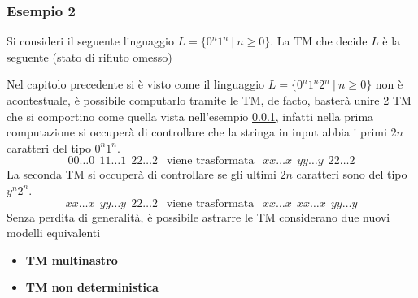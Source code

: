 \documentclass[10pt, letterpaper]{report}
\begin{document}
\subsubsection{Esempio 2}\label{esempioTM2}
Si consideri il seguente linguaggio $L=\{0^n1^n \ | \ n\ge 0\}$. La TM che decide $L$ è la seguente (stato di 
rifiuto omesso)\begin{center}
\end{center}
Nel capitolo precedente si è visto come il linguaggio $L=\{0^n1^n2^n \ | \ n\ge 0\}$  non è acontestuale, 
è possibile computarlo tramite le TM, de facto, basterà unire 2 TM che si comportino come 
quella vista nell'esempio \ref{esempioTM2}, infatti nella prima computazione si occuperà di controllare 
che la stringa in input abbia i primi $2n$ caratteri del tipo $0^n1^n$.$$
00\dots 0 \  \ 11\dots 1 \ \ 22\dots 2  \ \ \text{ viene trasformata } \ \ xx\dots x \ \ yy\dots y \ \ 22\dots 2$$
La seconda TM si occuperà di controllare se gli ultimi $2n$ caratteri sono del tipo $y^n2^n$. $$
xx \dots x \ \ yy\dots y\  \ 22\dots 2 \ \ \text{ viene trasformata }  \  \ xx\dots x \ \  xx \dots x  \ \ yy \dots y
$$
Senza perdita di generalità, è possibile astrarre le TM considerano due nuovi modelli equivalenti\begin{itemize}
    \item \textbf{TM multinastro}
    \item \textbf{TM non deterministica}
\end{itemize}
\end{document}
